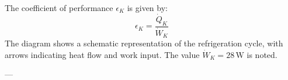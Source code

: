 The coefficient of performance \( \epsilon_K \) is given by:  
\[
\epsilon_K = \frac{\dot{Q}_K}{\dot{W}_K}
\]  
The diagram shows a schematic representation of the refrigeration cycle, with arrows indicating heat flow and work input. The value \( \dot{W}_K = 28 \, \text{W} \) is noted.

---